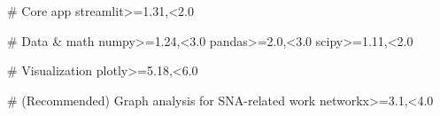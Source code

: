 # Core app
streamlit>=1.31,<2.0

# Data & math
numpy>=1.24,<3.0
pandas>=2.0,<3.0
scipy>=1.11,<2.0

# Visualization
plotly>=5.18,<6.0

# (Recommended) Graph analysis for SNA-related work
networkx>=3.1,<4.0